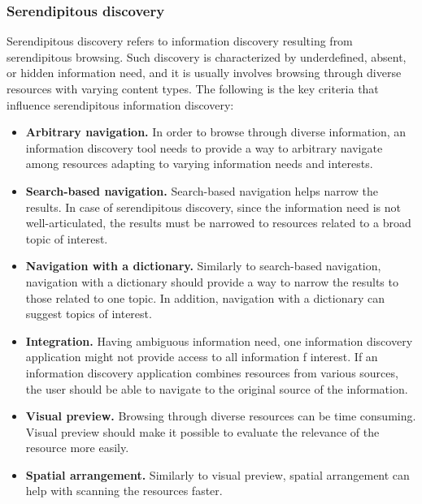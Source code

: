 \documentclass{casconpaper}
\begin{document}
{\subsubsection{Serendipitous discovery}
Serendipitous discovery refers to information discovery resulting from serendipitous  browsing. Such discovery is characterized by underdefined, absent, or hidden information need, and it is usually involves browsing through diverse resources with varying content types. The following is the key criteria that influence serendipitous information discovery:

\begin{itemize}
  \item \textbf{Arbitrary navigation.} In order to browse through diverse information, an information discovery tool needs to provide a way to arbitrary navigate among resources adapting to varying information needs and interests.
  \item \textbf{Search-based navigation.} Search-based navigation helps narrow the results. In case of serendipitous discovery, since the information need is not well-articulated, the results must be narrowed to resources related to a broad topic of interest.
  \item \textbf{Navigation with a dictionary.} Similarly to search-based navigation, navigation with a dictionary should provide a way to narrow the results to those related to one topic. In addition, navigation with a dictionary can suggest topics of interest.
  \item \textbf{Integration.} Having ambiguous information need, one information discovery application might not provide access to all information f interest. If an information discovery application combines resources from various sources, the user should be able to navigate to the original source of the information.
  \item \textbf{Visual preview.} Browsing through diverse resources can be time consuming. Visual preview should make it possible to evaluate the relevance of the resource more easily.
  
  \item \textbf{Spatial arrangement.} Similarly to visual preview, spatial arrangement can help with scanning the resources faster. 
  
\end{itemize}


} %
\end{document}
